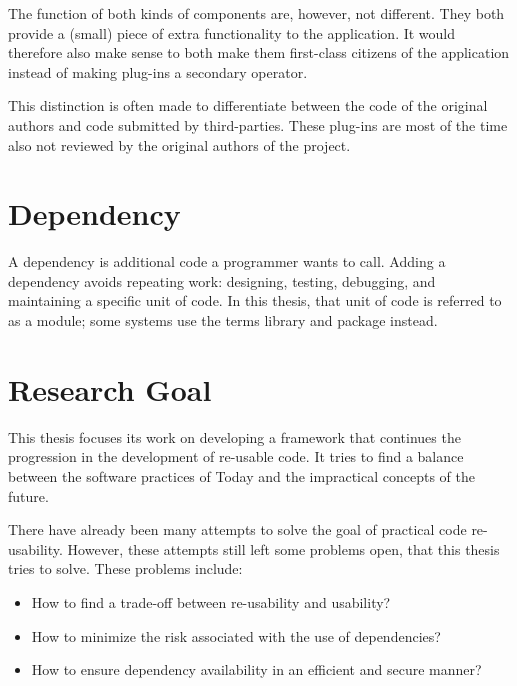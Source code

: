 The function of both kinds of components are, however, not different. They both provide a (small) piece of extra functionality to the application. It would therefore also make sense to both make them first-class citizens of the application instead of making plug-ins a secondary operator.

This distinction is often made to differentiate between the code of the original authors and code submitted by third-parties. These plug-ins are most of the time also not reviewed by the original authors of the project.

\section{Dependency}
A dependency is additional code a programmer wants to call. Adding a dependency avoids repeating work: designing, testing, debugging, and maintaining a specific
unit of code. In this thesis, that unit of code is referred to as a module; some
systems use the terms library and package instead. 

\section{Research Goal}

This thesis focuses its work on developing a framework that continues the progression in the development of re-usable code. It tries to find a balance between the software practices of Today and the impractical concepts of the future.

There have already been many attempts to solve the goal of practical code re-usability. However, these attempts still left some problems open, that this thesis tries to solve. These problems include:

\begin{itemize}
	\item How to find a trade-off between re-usability and usability?
	\item How to minimize the risk associated with the use of dependencies?
	\item How to ensure dependency availability in an efficient and secure manner?
\end{itemize}


